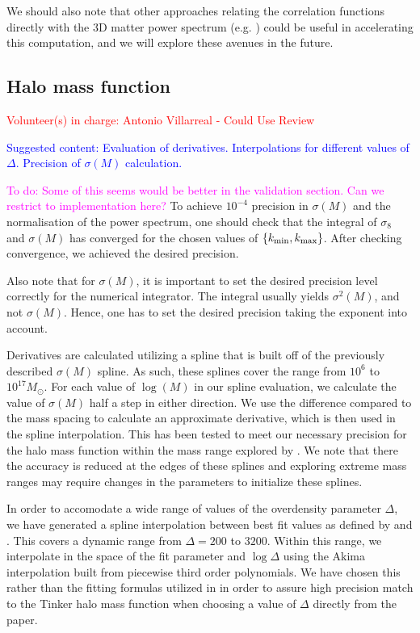 \documentclass[\docopts]{\docclass}
\newcommand{\todo}[1]{\textcolor{magenta}{To do: #1}}
\newcommand{\vol}[1]{\textcolor{red}{Volunteer(s) in charge: #1}}
\newcommand{\cont}[1]{\textcolor{blue}{Suggested content: #1}}
\begin{document}
We should also note that other approaches relating the correlation functions directly with the 3D matter power spectrum (e.g. \citealt{2017ApJ...845...28C}) could be useful in accelerating this computation, and we will explore these avenues in the future.




\subsection{Halo mass function}
\vol{Antonio Villarreal - Could Use Review}

\cont{Evaluation of derivatives. Interpolations for different values of $\Delta$. Precision of $\sigma(M)$ calculation.}

\todo{Some of this seems would be better in the validation section. Can we restrict to implementation here?}
To achieve $10^{-4}$ precision in $\sigma(M)$ and the normalisation of the power spectrum, one should check that the integral of $\sigma_8$ and $\sigma(M)$ has converged for the chosen values of $\{k_{\rm min},k_{\rm max}\}$. After checking convergence, we achieved the desired precision.

Also note that for $\sigma(M)$, it is important to set the desired precision level correctly for the numerical integrator. The integral usually yields $\sigma^2(M)$, and not $\sigma(M)$. Hence, one has to set the desired precision taking the exponent into account.

Derivatives are calculated utilizing a spline that is built off of the previously described $\sigma(M)$ spline. As such, these splines cover the range from $10^6$ to $10^{17} M_\odot$. For each value of $\log(M)$ in our spline evaluation, we calculate the value of $\sigma(M)$ half a step in either direction. We use the difference compared to the mass spacing to calculate an approximate derivative, which is then used in the spline interpolation. This has been tested to meet our necessary precision for the halo mass function within the mass range explored by \citet{Tinker2010}. We note that there the accuracy is reduced at the edges of these splines and exploring extreme mass ranges may require changes in the parameters to initialize these splines.

In order to accomodate a wide range of values of the overdensity parameter $\Delta$, we have generated a spline interpolation between best fit values as defined by \citet{Tinker2008} and \citet{Tinker2010}. This covers a dynamic range from $\Delta=200$ to $3200$. Within this range, we interpolate in the space of the fit parameter and $\log\Delta$ using the Akima interpolation built from piecewise third order polynomials. We have chosen this rather than the fitting formulas utilized in \citet{Tinker2010} in order to assure high precision match to the Tinker halo mass function when choosing a value of $\Delta$ directly from the paper. 
\end{document}
